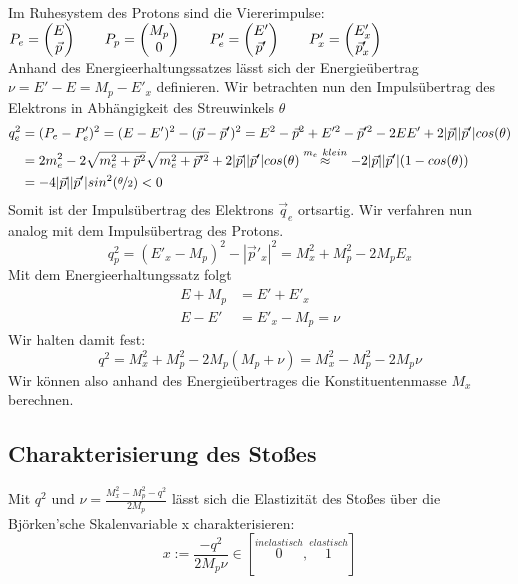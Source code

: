 \documentclass[Ex4_Zusammenfassung.tex]{subfiles}
\begin{document}
Im Ruhesystem des Protons sind die Viererimpulse: \newline
$P_e = \begin{pmatrix} E\\ \vec p \end{pmatrix} \qquad P_p = \begin{pmatrix} M_p\\ 0 \end{pmatrix} \qquad P'_e = \begin{pmatrix} E'\\ \vec p' \end{pmatrix} \qquad P'_x = \begin{pmatrix} E'_x\\ \vec p'_x \end{pmatrix}$ \\ \newline
Anhand des Energieerhaltungssatzes lässt sich der \newline Energieübertrag $\nu = E'-E = M_p - E'_x$ definieren. \newline
Wir betrachten nun den Impulsübertrag des Elektrons in Abhängigkeit des Streuwinkels $\theta$
\begin{align*}
	q_e^2 &= (P_e-P'_e)^2 = (E-E')^2 - (\vec p - \vec p')^2 = E^2 - \vec p^2 + E'^2 - \vec p'^2 - 2EE'+ 2|\vec p| |\vec p'| cos(\theta) \\ 
	 &= 2 m_e^2 - 2 \sqrt{m_e^2 + \vec p^2} \sqrt{m_e^2 + \vec p'^2} + 2|\vec p| |\vec p'| cos(\theta) \stackrel{m_e \ klein}{\approx} -2 |\vec p| |\vec p'|(1-cos(\theta)) \\
	 &= -4 |\vec p| |\vec p'| sin^2(\nicefrac{\theta}{2}) < 0
\end{align*}
Somit ist der Impulsübertrag des Elektrons $\vec q_e$ ortsartig. Wir verfahren nun analog mit dem Impulsübertrag des Protons.
\begin{equation*}
q_p^2 = (E'_x-M_p)^2 - |\vec p'_x|^2 = M_x^2 + M_p^2 - 2 M_p E_x
\end{equation*}
Mit dem Energieerhaltungssatz folgt
\begin{align*}
E + M_p &= E' + E'_x \\
E -E' &= E'_x - M_p = \nu
\end{align*}
Wir halten damit fest:
\begin{equation}
q^2 = M_x^2 + M_p^2 - 2 M_p(M_p + \nu) = M_x^2 - M_p^2 - 2M_p \nu
\end{equation}
Wir können also anhand des Energieübertrages die Konstituentenmasse $M_x$ berechnen.
\subsection{Charakterisierung des Stoßes}
Mit $q^2$ und $\nu= \frac{M_x^2-M_p^2-q^2}{2 M_p}$ lässt sich die Elastizität des Stoßes über die Björken'sche Skalenvariable x charakterisieren:
\begin{equation}
x := \frac{-q^2}{2 M_p \nu} \in [\stackrel{inelastisch}{0}, \stackrel{elastisch}{1}]
\end{equation}
\end{document}
